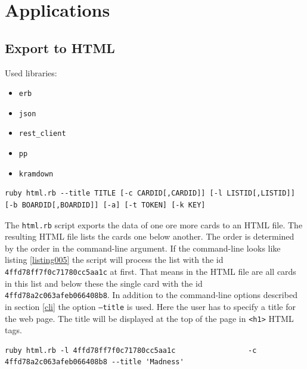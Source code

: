 
\chapter{Applications}

\section{Export to HTML}

Used libraries:
\begin{itemize}
	\item \texttt{erb}
	\item \texttt{json}
	\item \texttt{rest\_client}
	\item \texttt{pp}
	\item \texttt{kramdown}
\end{itemize}

\begin{lstlisting}[aboveskip=1\baselineskip, style=bash, caption=\texttt{html.rb} usage., label=listing026]
ruby html.rb --title TITLE [-c CARDID[,CARDID]] [-l LISTID[,LISTID]] [-b BOARDID[,BOARDID]] [-a] [-t TOKEN] [-k KEY]
\end{lstlisting}

The \texttt{html.rb} script exports the data of one ore more cards to an HTML file. The resulting HTML file lists the cards one below another. The order is determined by the order in the command-line argument. If the command-line looks like listing \ref{listing005} the script will process the list with the id \texttt{4ffd78ff7f0c71780cc5aa1c} at first. That means in the HTML file are all cards in this list and below these the single card with the id \texttt{4ffd78a2c063afeb066408b8}. In addition to the command-line options described in section \ref{cli} the option \texttt{--title} is used. Here the user has to specify a title for the web page. The title will be displayed at the top of the page in \lstinline{<h1>} HTML tags.

\begin{lstlisting}[aboveskip=1\baselineskip, style=bash, caption=Example for a \texttt{html.rb} call., label=listing005]
ruby html.rb -l 4ffd78ff7f0c71780cc5aa1c                 -c 4ffd78a2c063afeb066408b8 --title 'Madness'
\end{lstlisting} 

